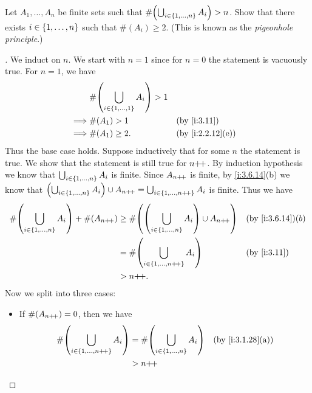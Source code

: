 \begin{ex}\label{i:ex:3.6.10}
  Let \(A_1, \dots, A_n\) be finite sets such that \(\#\pa{\bigcup_{i \in \set{1, \dots, n}} A_i} > n\).
  Show that there exists \(i \in \left\lbrace1, \dots, n\right\rbrace\) such that \(\#(A_i) \geq 2\).
  (This is known as the \emph{pigeonhole principle}.)
\end{ex}

\begin{proof}[]
  We induct on \(n\).
  We start with \(n = 1\) since for \(n = 0\) the statement is vacuously true.
  For \(n = 1\), we have
  \begin{align*}
             & \#\pa{\bigcup_{i \in \set{1, \dots, 1}} A_i} > 1                       \\
    \implies & \#(A_1) > 1                                      &  & \by{i:3.11}      \\
    \implies & \#(A_1) \geq 2.                                  &  & \by{i:2.2.12}[e]
  \end{align*}
  Thus the base case holds.
  Suppose inductively that for some \(n\) the statement is true.
  We show that the statement is still true for \(n{+}\!{+}\).
  By induction hypothesis we know that \(\bigcup_{i \in \left\lbrace1, \dots, n\right\rbrace} A_i\) is finite.
  Since \(A_{n{+}\!{+}}\) is finite, by \cref{i:3.6.14}(b) we know that \(\left\lparen\bigcup_{i \in \left\lbrace1, \dots, n\right\rbrace} A_i\right\rparen \cup A_{n{+}\!{+}} = \bigcup_{i \in \left\lbrace1, \dots, n{+}\!{+}\right\rbrace} A_i\) is finite.
  Thus we have
  \begin{align*}
    \#\pa{\bigcup_{i \in \set{1, \dots, n}} A_i} + \#(A_{n\pp}) & \geq \#\pa{\pa{\bigcup_{i \in \set{1, \dots, n}} A_i} \cup A_{n\pp}} &  & \by{i:3.6.14}(b) \\
                                                                & = \#\pa{\bigcup_{i \in \set{1, \dots, n\pp}} A_i}                    &  & \by{i:3.11}      \\
                                                                & > n\pp.
  \end{align*}
  Now we split into three cases:
  \begin{itemize}
    \item If \(\#(A_{n{+}\!{+}}) = 0\), then we have
          \begin{align*}
            \#\pa{\bigcup_{i \in \set{1, \dots, n\pp}} A_i} & = \#\pa{\bigcup_{i \in \set{1, \dots, n}} A_i} &  & \by{i:3.1.28}[a] \\
                                                            & > n\pp                                                               \\

\end{align*}
\end{itemize}
\end{proof}
